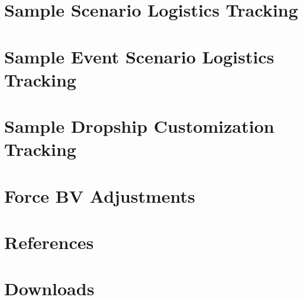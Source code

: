 \documentclass{article}
\newcommand{\mysectiontitle}{}
\newcommand{\newsection}[2]{\renewcommand{\mysectiontitle}{#2}\section{#1}}
\begin{document}
\newpage

\newsection{Sample Scenario Logistics Tracking}{sample-logistics}



\newpage

\newsection{Sample Event Scenario Logistics Tracking}{sample-logistics-event}



\newpage

\newsection{Sample Dropship Customization Tracking}{sample-dropship}



\newpage

\newsection{Force BV Adjustments}{bv-adjustments}
\label{sec:force_bv_adjustments}



\newpage

\newsection{References}{references}
\label{sec:references}



\newpage


\newsection{Downloads}{downloads}
\label{sec:downloads}



\newpage
\end{document}

